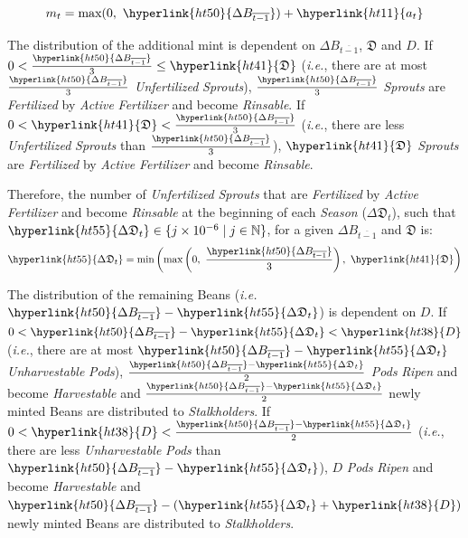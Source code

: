 \documentclass[tikz]{article}
\newcommand{\term}[1]{\textsl{#1}}
\begin{document}
    $$
        m_t = \text{max}(0,\ \hyperlink{ht50}{\Delta B_{\overline{t-1}}}) + \hyperlink{ht11}{a_t}
    $$
    
The distribution of the additional mint is dependent on \hyperlink{ht50}{$\Delta B_{\overline{t-1}}$}, \hyperlink{ht41}{$\mathfrak{D}$} and \hyperlink{ht38}{$D$}. If $0 < \frac{\hyperlink{ht50}{\Delta B_{\overline{t-1}}}}{3} \leq \hyperlink{ht41}{\mathfrak{D}}$ (\term{i.e.}, there are at most $\frac{\hyperlink{ht50}{\Delta B_{\overline{t-1}}}}{3}$ \term{Unfertilized} \term{Sprouts}), $\frac{\hyperlink{ht50}{\Delta B_{\overline{t-1}}}}{3}$ \term{Sprouts} are \term{Fertilized} by \term{Active} \term{Fertilizer} and become \term{Rinsable}. If $0 < \hyperlink{ht41}{\mathfrak{D}} < \frac{\hyperlink{ht50}{\Delta B_{\overline{t-1}}}}{3}$ (\term{i.e.}, there are less \term{Unfertilized} \term{Sprouts} than $\frac{\hyperlink{ht50}{\Delta B_{\overline{t-1}}}}{3}$), $\hyperlink{ht41}{\mathfrak{D}}$ \term{Sprouts} are \term{Fertilized} by \term{Active} \term{Fertilizer} and become \term{Rinsable}.

Therefore, the number of \term{Unfertilized} \term{Sprouts} that are \term{Fertilized} by \term{Active} \term{Fertilizer} and become \term{Rinsable} at the beginning of each \term{Season} (\hyperlink{ht55}{$\Delta \mathfrak{D}_t$}), such that $\hyperlink{ht55}{\Delta \mathfrak{D}_t} \in \{j \times 10^{-6} \mid j \in \mathbb{N} \}$, for a given \hyperlink{ht50}{$\Delta B_{\overline{t-1}}$} and \hyperlink{ht41}{$\mathfrak{D}$} is:
$$\hyperlink{ht55}{\Delta \mathfrak{D}_t} = \text{min}\left(\text{max}\left(0,\ \frac{\hyperlink{ht50}{\Delta B_{\overline{t-1}}}}{3}\right),\ \hyperlink{ht41}{\mathfrak{D}}\right)$$

The distribution of the remaining Beans (\term{i.e. $\hyperlink{ht50}{\Delta B_{\overline{t-1}}} - \hyperlink{ht55}{\Delta \mathfrak{D}_t}$}) is dependent on \hyperlink{ht38}{$D$}. If $0 < \hyperlink{ht50}{\Delta B_{\overline{t-1}}} - \hyperlink{ht55}{\Delta \mathfrak{D}_t} < \hyperlink{ht38}{D}$ (\term{i.e.}, there are at most $\hyperlink{ht50}{\Delta B_{\overline{t-1}}} - \hyperlink{ht55}{\Delta \mathfrak{D}_t}$ \term{Unharvestable} \term{Pods}), $\frac{\hyperlink{ht50}{\Delta B_{\overline{t-1}}} - \hyperlink{ht55}{\Delta \mathfrak{D}_t}}{2}$ \term{Pods} \term{Ripen} and become \term{Harvestable} and $\frac{\hyperlink{ht50}{\Delta B_{\overline{t-1}}} - \hyperlink{ht55}{\Delta \mathfrak{D}_t}}{2}$ newly minted Beans are distributed to \term{Stalkholders}. If $0 < \hyperlink{ht38}{D} < \frac{\hyperlink{ht50}{\Delta B_{\overline{t-1}}} - \hyperlink{ht55}{\Delta \mathfrak{D}_t}}{2}$ (\term{i.e.}, there are less \term{Unharvestable} \term{Pods} than $\hyperlink{ht50}{\Delta B_{\overline{t-1}}} - \hyperlink{ht55}{\Delta \mathfrak{D}_t}$), \hyperlink{ht38}{$D$} \term{Pods} \term{Ripen} and become \term{Harvestable} and $\hyperlink{ht50}{\Delta B_{\overline{t-1}}} - (\hyperlink{ht55}{\Delta \mathfrak{D}_t} + \hyperlink{ht38}{D})$ newly minted Beans are distributed to \term{Stalkholders}.
\end{document}
